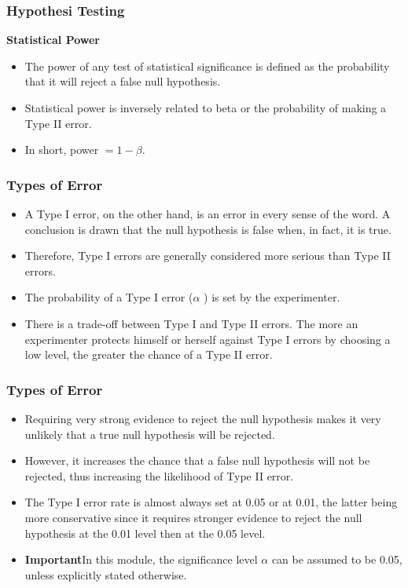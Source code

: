 \documentclass[a4]{beamer}
\begin{document}
\begin{frame}
	\frametitle{Hypothesi Testing}
	\large
	\noindent \textbf{Statistical Power}
	\begin{itemize}
\item 	The power of any test of statistical significance is defined as the probability that it will reject a false null hypothesis. \item Statistical power is inversely related to beta or the probability of making a Type II error.
\item  In short, power $= 1 - \beta$.
	\end{itemize}

\end{frame}
\begin{frame}
	\frametitle{Types of Error}
	\large
	\begin{itemize}
		\item
		A Type I error, on the other hand, is an error in every sense of the word. A conclusion is drawn that the null hypothesis is false when, in fact, it is true. \item Therefore, Type I errors are generally considered more serious than Type II errors. \smallskip
		\item
		The probability of a Type I error ($\alpha$ ) is set by the experimenter. \smallskip \item There is a trade-off between Type I and Type II errors. The more an experimenter protects himself or herself against Type I errors by choosing a low level, the greater the chance of a Type II error.
	\end{itemize}
\end{frame}
\begin{frame}
	\frametitle{Types of Error}
	\large
	\begin{itemize}
		\item
		Requiring very strong evidence to reject the null hypothesis makes it very unlikely that a true null hypothesis will be rejected. \smallskip \item However, it increases the chance that a false null hypothesis will not be rejected, thus increasing the likelihood of Type II error.\smallskip
		\item
		The Type I error rate is almost always set at 0.05 or at 0.01, the latter being more conservative since it requires stronger evidence to reject the null hypothesis at the 0.01 level then at the 0.05 level. \smallskip
		\item \textbf{Important}In this module, the significance level $\alpha$ can be assumed to be 0.05, unless explicitly stated otherwise.
	\end{itemize}
\end{frame}
\end{document}
